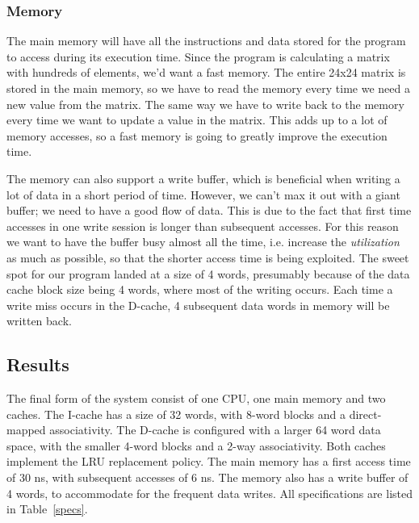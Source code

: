 \documentclass[a4paper,9pt,fleqn]{article}
\begin{document}
\subsubsection{Memory}
The main memory will have all the instructions and data stored for the program to access during its 
execution time. Since the program is calculating a matrix with hundreds of elements, we'd want a fast 
memory. The entire 24x24 matrix is stored in the main memory, so we have to read the memory every 
time we need a new value from the matrix. The same way we have to write back to the memory every 
time we want to update a value in the matrix. This adds up to a lot of memory accesses, so a fast memory 
is going to greatly improve the execution time. 

The memory can also support a write buffer, which is beneficial when writing a lot of data in a short period 
of time. However, we can't max it out with a giant buffer; we need to have a good flow of data. This is due 
to the fact that first time accesses in one write session is longer than subsequent accesses. For this 
reason we want to have the buffer busy almost all the time, i.e. increase the {\it utilization} as much as 
possible, so that the shorter access time is being exploited. The sweet spot for our program landed at a 
size of 4 words, presumably because of the data cache block size being 4 words, where most of the 
writing occurs. Each time a write miss occurs in the D-cache, 4 subsequent data words in memory will be 
written back.

\subsection{Results}
The final form of the system consist of one CPU, one main memory and two caches. The I-cache has a
size of 32 words, with 8-word blocks and a direct-mapped associativity. The D-cache is configured with a 
larger 64 word data space, with the smaller 4-word blocks and a 2-way associativity. Both caches 
implement the LRU replacement policy. The main memory has a first access time of 30 ns, with 
subsequent accesses of 6 ns. The memory also has a write buffer of 4 words, to accommodate for the 
frequent data writes. All specifications are listed in Table~\ref{specs}.

\newpage
\end{document}
